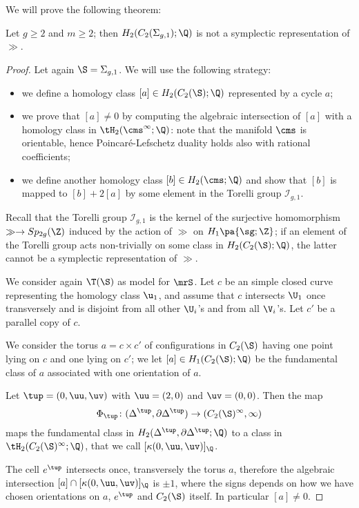 We will prove the following theorem:
\begin{thm}
 \label{thm:counterexample}
 Let $g\geq 2$ and $m\geq 2$; then $H_2(C_2(\Sigma_{g,1});\Q)$ is not a symplectic
 representation of $\gg$.
\end{thm}
\begin{proof}
 Let again $\S=\Sigma_{g,1}$. We will use the following strategy:
 \begin{itemize}
  \item we define a homology class $[a]\in H_2(C_2(\S);\Q)$ represented by a cycle $a$;
  \item we prove that $[a]\neq 0$ by computing the algebraic intersection of
  $[a]$ with a homology class
  in $\tH_2(\cms^{\infty};\Q)$: note that the manifold
  $\cms$ is orientable, hence Poincaré-Lefschetz duality holds
  also with rational coefficients;
  \item we define another homology class $[b]\in H_2(\cms;\Q)$ and show that
  $[b]$ is mapped to $[b]+2[a]$ by some element in the Torelli group $\mathcal{I}_{g,1}$.
 \end{itemize}
Recall that the Torelli group $\mathcal{I}_{g,1}$ is the kernel of the surjective homomorphism
$\gg\to Sp_{2g}(\Z)$ induced by the action of $\gg$ on $H_1\pa{\sg;\Z}$; if an element of the Torelli group acts non-trivially on
some class in $H_2(C_2(\S);\Q)$, the latter cannot be a symplectic representation of $\gg$.

We consider again $\T(\S)$ as model for $\mrS$. Let $c$ be an simple closed curve
representing the homology class $\u_1$, and assume that $c$ intersects $\U_1$ once
transversely and is disjoint from all other $\U_i$'s and from all $\V_i$'s. Let $c'$
be a parallel copy of $c$.

We consider the torus $a=c\times c'$ of configurations in $C_2(\S)$ having one point lying on $c$ and
one lying on $c'$; we let $[a]\in H_1(C_2(\S);\Q)$ be the fundamental class of $a$ associated with one
orientation of $a$.

Let $\tup=(0,\uu,\uv)$ with $\uu=(2,0)$ and $\uv=(0,0)$.
Then the map
\[
\Phi_{\tup}\colon (\Delta^{\tup},\partial\Delta^{\tup})\to (C_2(\S)^{\infty},\infty)
\]
maps the fundamental class in $H_2(\Delta^{\tup},\partial\Delta^{\tup};\Q)$ to a
class in $\tH_2(C_2(\S)^{\infty};\Q)$, that we call $[\kappa(0,\uu,\uv)]_{\Q}$.

The cell $e^{\tup}$ intersects once, transversely the torus $a$, therefore the
algebraic intersection $[a]\cap[\kappa(0,\uu,\uv)]_{\Q}$ is $\pm 1$,
where the signs depends on how we have chosen orientations on $a$, $e^{\tup}$ and $C_2(\S)$ itself.
In particular $[a]\neq 0$.


\end{proof}
